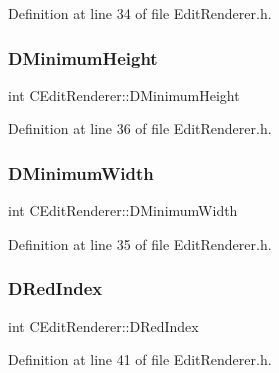 Definition at line 34 of file Edit\+Renderer.\+h.

\hypertarget{classCEditRenderer_a9e063123747e147ef1c35bd962205fbd}{}\label{classCEditRenderer_a9e063123747e147ef1c35bd962205fbd} 
\subsubsection{\texorpdfstring{D\+Minimum\+Height}{DMinimumHeight}}
{\footnotesize\ttfamily int C\+Edit\+Renderer\+::\+D\+Minimum\+Height\hspace{0.3cm}{\ttfamily [protected]}}



Definition at line 36 of file Edit\+Renderer.\+h.

\hypertarget{classCEditRenderer_aba068f1e6d267e5ac0ed5752304133e8}{}\label{classCEditRenderer_aba068f1e6d267e5ac0ed5752304133e8} 
\subsubsection{\texorpdfstring{D\+Minimum\+Width}{DMinimumWidth}}
{\footnotesize\ttfamily int C\+Edit\+Renderer\+::\+D\+Minimum\+Width\hspace{0.3cm}{\ttfamily [protected]}}



Definition at line 35 of file Edit\+Renderer.\+h.

\hypertarget{classCEditRenderer_a77ce4df48e03a8b9245f2045c2c3c4e7}{}\label{classCEditRenderer_a77ce4df48e03a8b9245f2045c2c3c4e7} 
\subsubsection{\texorpdfstring{D\+Red\+Index}{DRedIndex}}
{\footnotesize\ttfamily int C\+Edit\+Renderer\+::\+D\+Red\+Index\hspace{0.3cm}{\ttfamily [protected]}}



Definition at line 41 of file Edit\+Renderer.\+h.

